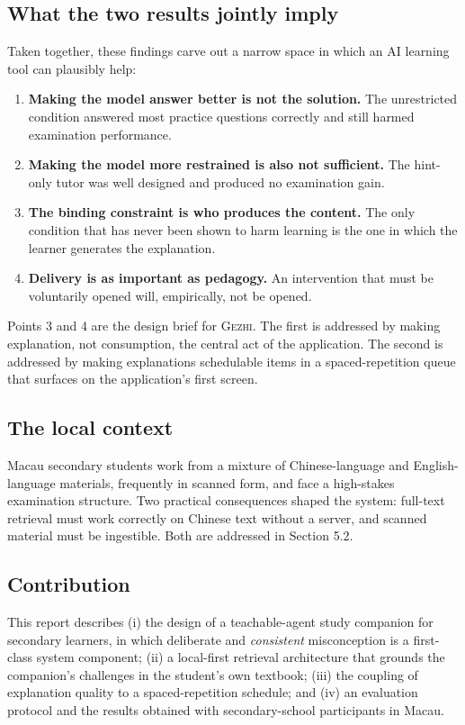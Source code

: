 \documentclass[11pt,a4paper]{article}
\newcommand{\gezhi}{\textsc{Gezhi}}
\begin{document}
\subsection{What the two results jointly imply}

Taken together, these findings carve out a narrow space in which an AI learning tool can
plausibly help:

\begin{enumerate}
  \item \textbf{Making the model answer better is not the solution.} The unrestricted
  condition answered most practice questions correctly and still harmed examination
  performance.
  \item \textbf{Making the model more restrained is also not sufficient.} The hint-only
  tutor was well designed and produced no examination gain.
  \item \textbf{The binding constraint is who produces the content.} The only condition that
  has never been shown to harm learning is the one in which the learner generates the
  explanation.
  \item \textbf{Delivery is as important as pedagogy.} An intervention that must be
  voluntarily opened will, empirically, not be opened.
\end{enumerate}

Points 3 and 4 are the design brief for \gezhi{}. The first is addressed by making
explanation, not consumption, the central act of the application. The second is addressed by
making explanations schedulable items in a spaced-repetition queue that surfaces on the
application's first screen.

\subsection{The local context}

Macau secondary students work from a mixture of Chinese-language and English-language
materials, frequently in scanned form, and face a high-stakes examination structure. Two
practical consequences shaped the system: full-text retrieval must work correctly on
Chinese text without a server, and scanned material must be ingestible. Both are addressed
in Section 5.2.

\subsection{Contribution}

This report describes (i) the design of a teachable-agent study companion for secondary
learners, in which deliberate and \emph{consistent} misconception is a first-class system
component; (ii) a local-first retrieval architecture that grounds the companion's challenges
in the student's own textbook; (iii) the coupling of explanation quality to a
spaced-repetition schedule; and (iv) an evaluation protocol and the results obtained with
secondary-school participants in Macau.
\end{document}
